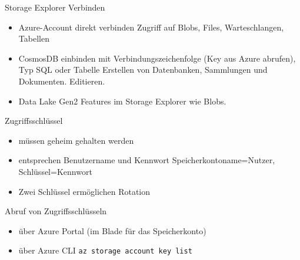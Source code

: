 \begin{flashcard}[Definition]{Storage Explorer Verbinden}
    \begin{itemize}
        \item Azure-Account direkt verbinden\newline
        Zugriff auf Blobs, Files, Warteschlangen, Tabellen
        \item CosmosDB einbinden mit Verbindungszeichenfolge (Key aus Azure abrufen), Typ SQL oder Tabelle\newline
        Erstellen von Datenbanken, Sammlungen und Dokumenten. Editieren.
        \item Data Lake Gen2\newline
        Features im Storage Explorer wie Blobs.
    \end{itemize}
\end{flashcard}


\begin{flashcard}[Definition]{Zugriffsschlüssel}
    \begin{itemize}
        \item müssen geheim gehalten werden
        \item entsprechen Benutzername und Kennwort\newline
            Speicherkontoname=Nutzer, Schlüssel=Kennwort
        \item Zwei Schlüssel ermöglichen Rotation
    \end{itemize}
    \vspace{1cm}
    Abruf von Zugriffsschlüsseln
    \begin{itemize}
        \item über Azure Portal (im Blade für das Speicherkonto)
        \item über Azure CLI\newline
            \texttt{az storage account key list}
    \end{itemize}
\end{flashcard}

